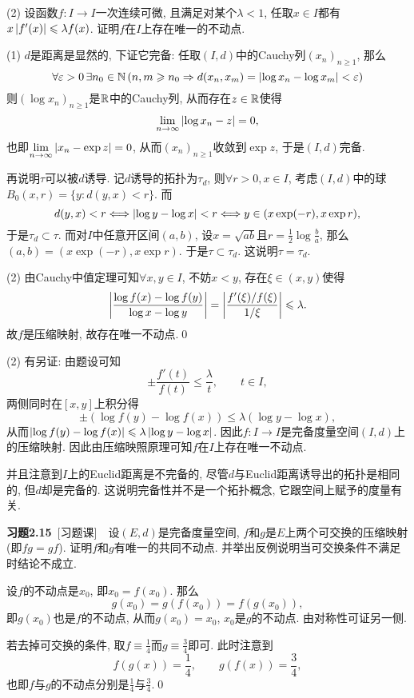     (2) 设函数$ f : I\to I $一次连续可微, 且满足对某个$ \lambda<1 $, 任取$ x\in I $都有$ x\left| f'(x) \right| \leqslant\lambda f(x) $. 证明$ f $在$ I $上存在唯一的不动点.
    \begin{Proof}
    (1) $ d $是距离是显然的, 下证它完备: 任取$ (I,d) $中的Cauchy列$ (x_n)_{n\geqslant 1} $, 那么
    \[
    \forall\varepsilon>0\,\exists n_0\in\mathbb{N}\,(n,m\geqslant n_0\Rightarrow d(x_n,x_m)=\left| \log{x_n}-\log{x_m} \right| <\varepsilon)
    \]
    则$ (\log x_n)_{n\geqslant 1} $是$ \mathbb{R} $中的Cauchy列, 从而存在$ z\in\mathbb{R} $使得
    \[
    \lim_{n\to\infty}\left| \log x_n-z \right| =0,
    \]
    也即$ \lim\limits_{n\to\infty}\left| x_n-\exp z \right| =0 $, 从而$ (x_n)_{n\geqslant 1} $收敛到$ \exp z $, 于是$ (I,d) $完备.

    再说明$ \tau $可以被$ d $诱导. 记$ d $诱导的拓扑为$ \tau_d $, 则$ \forall r>0,x\in I $, 考虑$ (I,d) $中的球$ B_0(x,r)=\{ y : d(y,x)<r \} $. 而
    \[
    d(y,x)<r\Longleftrightarrow\left| \log y-\log x \right| <r\Longleftrightarrow y\in(x\exp (-r),x\exp r),
    \]
    于是$ \tau_d\subset \tau $. 而对$ I $中任意开区间$ (a,b) $, 设$ x=\sqrt{ab} $且$ r=\frac{1}{2}\log\frac{b}{a} $, 那么$ (a,b)=(x\exp(-r),x\exp r) $. 于是$ \tau\subset\tau_d $. 这说明$ \tau=\tau_d $.

    (2) 由Cauchy中值定理可知$ \forall x,y\in I $, 不妨$ x<y $, 存在$ \xi\in(x,y) $使得
    \[
    \left| \frac{\log f(x)-\log f(y)}{\log x-\log y} \right| =\left| \frac{f'(\xi)/f(\xi)}{1/\xi} \right| \leqslant\lambda.
    \]
    故$ f $是压缩映射, 故存在唯一不动点.\qed
    \end{Proof}
    \begin{Remark}
    (2) 有另证: 由题设可知
    \[
    \pm\frac{f'(t)}{f(t)}\leqslant\frac{\lambda}{t},\qquad t\in I,
    \]
    两侧同时在$ [x,y] $上积分得
    \[
    \pm(\log f(y)-\log f(x))\leqslant\lambda(\log y-\log x),
    \]
    从而$ \left| \log f(y)-\log f(x) \right| \leqslant\lambda\left| \log y-\log x \right|  $. 因此$ f : I\to I $是完备度量空间$ (I,d) $上的压缩映射. 因此由压缩映照原理可知$ f $在$ I $上存在唯一不动点.

    并且注意到$ I $上的Euclid距离是不完备的, 尽管$ d $与Euclid距离诱导出的拓扑是相同的, 但$ d $却是完备的. 这说明完备性并不是一个拓扑概念, 它跟空间上赋予的度量有关.
    \end{Remark}

    \textbf{习题2.15}\ [习题课]\ \ 设$ (E,d) $是完备度量空间, $ f $和$ g $是$ E $上两个可交换的压缩映射(即$ fg=gf $). 证明$ f $和$ g $有唯一的共同不动点. 并举出反例说明当可交换条件不满足时结论不成立.
    \begin{Proof}
    设$ f $的不动点是$ x_0 $, 即$ x_0=f(x_0) $. 那么
    \[
    g(x_0)=g(f(x_0))=f(g(x_0)),
    \]
    即$ g(x_0) $也是$ f $的不动点, 从而$ g(x_0)=x_0 $, $ x_0 $是$ g $的不动点. 由对称性可证另一侧.

    若去掉可交换的条件, 取$ f\equiv\frac{1}{4} $而$ g\equiv\frac{3}{4} $即可. 此时注意到
    \[
    f(g(x))=\frac{1}{4},\qquad g(f(x))=\frac{3}{4},
    \]
    也即$ f $与$ g $的不动点分别是$ \frac{1}{4} $与$ \frac{3}{4} $.\qed
    \end{Proof}


